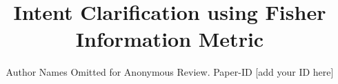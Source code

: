 \documentclass[conference]{IEEEtran}
\begin{document}
\title{Intent Clarification using Fisher Information Metric}

\author{Author Names Omitted for Anonymous Review. Paper-ID [add your ID here]}





% 


\maketitle
\end{document}
